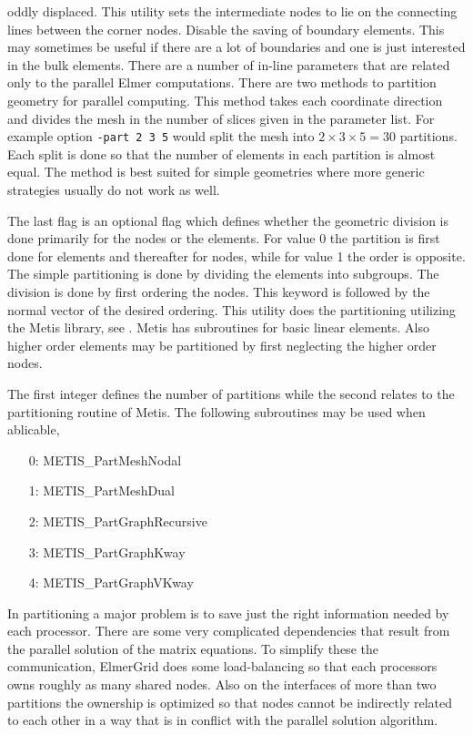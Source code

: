 oddly displaced. This utility sets the intermediate nodes to lie on the connecting lines
between the corner nodes. 
%
Disable the saving of boundary elements.
This may sometimes be useful if there are a lot of boundaries and one is just interested 
in the bulk elements.
\sifend
%
There are a number of in-line parameters that are related only to the parallel Elmer computations.
%
\sifbegin
{} 
There are two methods to partition geometry for parallel computing. This
method takes each coordinate direction and divides the mesh in the number
of slices given in the parameter list. For example option
\texttt{-part 2 3 5} would split the mesh into $2\times 3 \times 5 = 30$ partitions. 
Each split is done so that the number of elements in each partition
is almost equal. The method is best suited for simple geometries 
where more generic strategies usually do not work as well.

The last flag is an optional flag which defines whether the geometric division is done 
primarily for the nodes or the elements. For value 0 the partition is first done for elements and
thereafter for nodes, while for value 1 the order is opposite.
%
The simple partitioning is done by dividing the elements
into subgroups. The division is done by first ordering the nodes. This
keyword is followed by the normal vector of the desired ordering.
%
This utility does the partitioning utilizing the Metis library, see
. Metis has subroutines
for basic linear elements. Also higher order elements may be partitioned
by first neglecting the higher order nodes.

The first integer defines the number of partitions while the second relates
to the partitioning routine of Metis. The following subroutines may be used when ablicable,
\begin{enumerate}
\item[0:]    METIS\_PartMeshNodal
\item[1:]    METIS\_PartMeshDual
\item[2:]    METIS\_PartGraphRecursive
\item[3:]    METIS\_PartGraphKway
\item[4:]    METIS\_PartGraphVKway
\end{enumerate}

In partitioning a major problem is to save just the right information
needed by each processor. There are some very complicated dependencies that
result from the parallel solution of the matrix equations. To simplify these
the communication, ElmerGrid does some load-balancing so that each processors
owns roughly as many shared nodes. Also on the interfaces of more than two
partitions the ownership is optimized so that nodes cannot be 
indirectly related to each other in a way that is in conflict with 
the parallel solution algorithm. 

